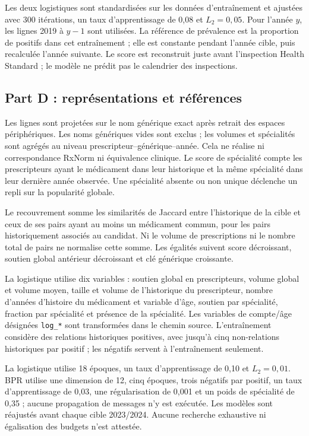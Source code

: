\documentclass[10pt,a4paper]{article}
\newcommand{\src}[1]{{\small\nolinkurl{#1}}}
\begin{document}
Les deux logistiques sont standardisées sur les données d'entraînement et ajustées avec 300 itérations, un taux d'apprentissage de 0,08 et $L_2=0,05$. Pour l'année $y$, les lignes 2019 à $y-1$ sont utilisées. La référence de prévalence est la proportion de positifs dans cet entraînement ; elle est constante pendant l'année cible, puis recalculée l'année suivante. Le score est reconstruit juste avant l'inspection Health Standard ; le modèle ne prédit pas le calendrier des inspections.

\subsection{Part D : représentations et références}
Les lignes sont projetées sur le nom générique exact après retrait des espaces périphériques. Les noms génériques vides sont exclus ; les volumes et spécialités sont agrégés au niveau prescripteur--générique--année. Cela ne réalise ni correspondance RxNorm ni équivalence clinique. Le score de spécialité compte les prescripteurs ayant le médicament dans leur historique et la même spécialité dans leur dernière année observée. Une spécialité absente ou non unique déclenche un repli sur la popularité globale.

Le recouvrement somme les similarités de Jaccard entre l'historique de la cible et ceux de ses pairs ayant au moins un médicament commun, pour les pairs historiquement associés au candidat. Ni le volume de prescriptions ni le nombre total de pairs ne normalise cette somme. Les égalités suivent score décroissant, soutien global antérieur décroissant et clé générique croissante\cite{hgbcode,hgbpartd}.

La logistique utilise dix variables : soutien global en prescripteurs, volume global et volume moyen, taille et volume de l'historique du prescripteur, nombre d'années d'histoire du médicament et variable d'âge, soutien par spécialité, fraction par spécialité et présence de la spécialité. Les variables de compte/âge désignées \src{log_*} sont transformées dans le chemin source. L'entraînement considère des relations historiques positives, avec jusqu'à cinq non-relations historiques par positif ; les négatifs servent à l'entraînement seulement.

La logistique utilise 18 époques, un taux d'apprentissage de 0,10 et $L_2=0,01$. BPR utilise une dimension de 12, cinq époques, trois négatifs par positif, un taux d'apprentissage de 0,03, une régularisation de 0,001 et un poids de spécialité de 0,35 ; aucune propagation de messages n'y est exécutée. Les modèles sont réajustés avant chaque cible 2023/2024. Aucune recherche exhaustive ni égalisation des budgets n'est attestée.
\end{document}
